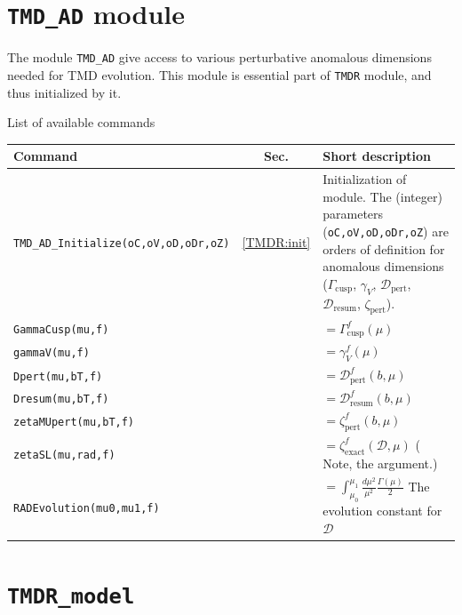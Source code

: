 \documentclass[prd,nofootinbib,eqsecnum,final]{revtex4}
\renewcommand{\(}{\left(}
\renewcommand{\)}{\right)}
\renewcommand{\[}{\left[}
\renewcommand{\]}{\right]}
\newcommand{\blue}[1]{{\color{blue} #1}}
\begin{document}
\newpage

\section{\texttt{TMD\_AD} module}
\label{TMD_AD}

The module \texttt{TMD\_AD} give access to various perturbative anomalous dimensions needed for TMD evolution. This module is essential part of \texttt{TMDR} module, and thus initialized by it.

\begin{center}
List of available commands
\\
\begin{tabular}{||l|c|p{10cm}||}
\hline\hline
Command & ~~Sec.~~ & Short description
\\\hline
\texttt{TMD\_AD\_Initialize(oC,oV,oD,oDr,oZ) } & \ref{TMDR:init} & Initialization of module. The (integer) parameters (\texttt{oC,oV,oD,oDr,oZ}) are orders of definition for anomalous dimensions ($\Gamma_{\text{cusp}}$, $\gamma_V$, $\mathcal{D}_{\text{pert}}$, $\mathcal{D}_{\text{resum}}$, $\zeta_{\text{pert}}$).
\\\hline
\texttt{GammaCusp(mu,f)} &  & $=\Gamma_{\text{cusp}}^f(\mu)$
\\\hline
\texttt{gammaV(mu,f)} &  & $=\gamma_V^f(\mu)$
\\\hline
\texttt{Dpert(mu,bT,f)} &  & $=\mathcal{D}_{\text{pert}}^f(b,\mu)$
\\\hline
\texttt{Dresum(mu,bT,f)} & &  $=\mathcal{D}_{\text{resum}}^f(b,\mu)$
\\\hline
\texttt{zetaMUpert(mu,bT,f)} &  & $=\zeta_{\text{pert}}^f(b,\mu)$
\\\hline
\texttt{zetaSL(mu,rad,f)} & &  $=\zeta_{\text{exact}}^f(\mathcal{D},\mu)$ (\blue{Note, the argument.})
\\\hline
\texttt{RADEvolution(mu0,mu1,f)} & &  $=\int_{\mu_0}^{\mu_1} \frac{d\mu^2}{\mu^2}\frac{\Gamma(\mu)}{2}$ The evolution constant for $\mathcal{D}$
\\
\hline\hline
\end{tabular}
\end{center}

\newpage
\section{\texttt{TMDR\_model}}
\end{document}
